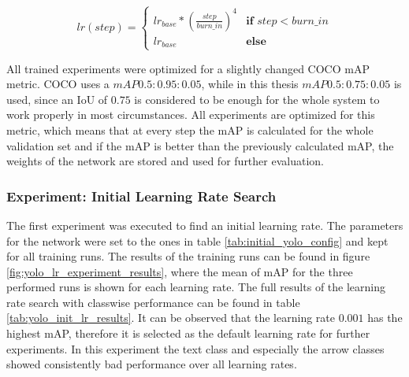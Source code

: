 \begin{equation}
    lr(step) =
    \begin{cases}
        lr_{base} * (\frac{step}{burn\_in})^4 & \textbf{if } step < burn\_in\\
        lr_{base}                             & \textbf{else}
    \end{cases}
\end{equation}

All trained experiments were optimized for a slightly changed COCO mAP metric.
COCO uses a $mAP0.5:0.95:0.05$, while in this thesis $mAP0.5:0.75:0.05$ is used, since an \ac{IoU} of $0.75$ is considered to be enough for the whole system to work properly in most circumstances.
All experiments are optimized for this metric, which means that at every step the mAP is calculated for the whole validation set and if the mAP is better than the previously calculated mAP, the weights of the network are stored and used for further evaluation.

\subsubsection{Experiment: Initial Learning Rate Search}

The first experiment was executed to find an initial learning rate.
The parameters for the network were set to the ones in table \ref{tab:initial_yolo_config} and kept for all training runs.
The results of the training runs can be found in figure \ref{fig:yolo_lr_experiment_results}, where the mean of mAP for the three performed runs is shown for each learning rate.
The full results of the learning rate search with classwise performance can be found in table \ref{tab:yolo_init_lr_results}.
It can be observed that the learning rate $0.001$ has the highest \ac{mAP}, therefore it is selected as the default learning rate for further experiments.
In this experiment the text class and especially the arrow classes showed consistently bad performance over all learning rates.

